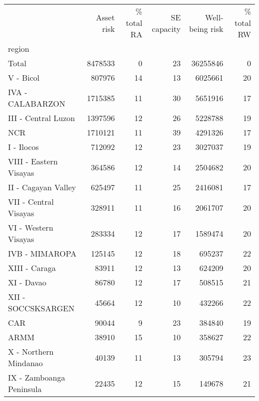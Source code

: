 \begin{tabular}{lrrrrr}
\toprule
{} &  Asset risk &  \% total RA &  SE capacity &  Well-being risk &  \% total RW \\
region                   &             &             &              &                  &             \\
\midrule
Total                    &     8478533 &           0 &           23 &         36255846 &           0 \\
V - Bicol                &      807976 &          14 &           13 &          6025661 &          20 \\
IVA - CALABARZON         &     1715385 &          11 &           30 &          5651916 &          17 \\
III - Central Luzon      &     1397596 &          12 &           26 &          5228788 &          19 \\
NCR                      &     1710121 &          11 &           39 &          4291326 &          17 \\
I - Ilocos               &      712092 &          12 &           23 &          3027037 &          19 \\
VIII - Eastern Visayas   &      364586 &          12 &           14 &          2504682 &          20 \\
II - Cagayan Valley      &      625497 &          11 &           25 &          2416081 &          17 \\
VII - Central Visayas    &      328911 &          11 &           16 &          2061707 &          20 \\
VI - Western Visayas     &      283334 &          12 &           17 &          1589474 &          20 \\
IVB - MIMAROPA           &      125145 &          12 &           18 &           695237 &          22 \\
XIII - Caraga            &       83911 &          12 &           13 &           624209 &          20 \\
XI - Davao               &       86780 &          12 &           17 &           508515 &          21 \\
XII - SOCCSKSARGEN       &       45664 &          12 &           10 &           432266 &          22 \\
CAR                      &       90044 &           9 &           23 &           384840 &          19 \\
ARMM                     &       38910 &          15 &           10 &           358627 &          22 \\
X - Northern Mindanao    &       40139 &          11 &           13 &           305794 &          23 \\
IX - Zamboanga Peninsula &       22435 &          12 &           15 &           149678 &          21 \\
\bottomrule
\end{tabular}
